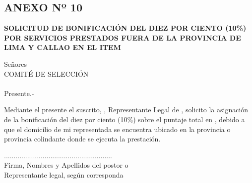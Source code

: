 \begin{center}
    \section*{ANEXO Nº 10 } 
    \textbf{SOLICITUD DE BONIFICACIÓN DEL DIEZ POR CIENTO (10\%) POR SERVICIOS PRESTADOS FUERA DE LA PROVINCIA DE LIMA Y CALLAO EN EL ITEM \objeto} 
    \end{center}
    
    Señores \\
    COMITÉ DE SELECCIÓN \\
    \nomenclatura \\
    Presente.-
    
    \vspace{0.5cm}
    
    Mediante el presente el suscrito, \representante, Representante Legal de \empresa, solicito la asignación de la bonificación del diez por ciento (10\%) sobre el puntaje total en \objeto, debido a que el domicilio de mi representada se encuentra ubicado en la provincia o provincia colindante donde se ejecuta la prestación. 
    
    \vspace{0.5cm}
    
    \fecha 
    
    \vspace{2cm}
    
    \begin{center}
    ........................................................\\
    Firma, Nombres y Apellidos del postor o \\ 
    Representante legal, según corresponda
    
    \end{center}